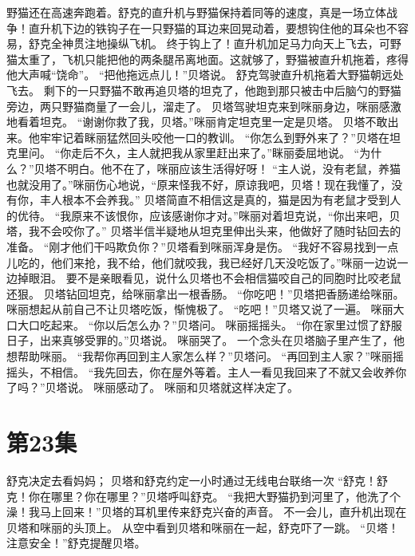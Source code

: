 \documentclass[a4paper,12pt,UTF8,twoside]{ctexbook}
\begin{document}
        野猫还在高速奔跑着。舒克的直升机与野猫保持着同等的速度，真是一场立体战争！直升机下边的铁钩子在一只野猫的耳边来回晃动着，要想钩住他的耳朵也不容易，舒克全神贯注地操纵飞机。 
        终于钩上了！直升机加足马力向天上飞去，可野猫太重了，飞机只能把他的两条腿吊离地面。这就够了，野猫被直升机拖着，疼得他大声喊“饶命”。 
        “把他拖远点儿！”贝塔说。 
        舒克驾驶直升机拖着大野猫朝远处飞去。 
        剩下的一只野猫不敢再追贝塔的坦克了，他跑到那只被击中后脑勺的野猫旁边，两只野猫商量了一会儿，溜走了。 
        贝塔驾驶坦克来到咪丽身边，咪丽感激地看着坦克。 
        “谢谢你救了我，贝塔。”咪丽肯定坦克里一定是贝塔。 
        贝塔不敢出来。他牢牢记着眯丽猛然回头咬他一口的教训。 
        “你怎么到野外来了？”贝塔在坦克里问。 
        “你走后不久，主人就把我从家里赶出来了。”眯丽委屈地说。 
        “为什么？”贝塔不明白。他不在了，咪丽应该生活得好呀！ 
        “主人说，没有老鼠，养猫也就没用了。”咪丽伤心地说，“原来怪我不好，原谅我吧，贝塔！现在我懂了，没有你，丰人根本不会养我。” 
        贝塔简直不相信这是真的，猫是因为有老鼠才受到人的优待。 
        “我原来不该恨你，应该感谢你才对。”咪丽对着坦克说，“你出来吧，贝塔，我不会咬你了。” 
        贝塔半信半疑地从坦克里伸出头来，他做好了随时钻回去的准备。 
        “刚才他们干吗欺负你？”贝塔看到咪丽浑身是伤。 
        “我好不容易找到一点儿吃的，他们来抢，我不给，他们就咬我，我已经好几天没吃饭了。”咪丽一边说一边掉眼泪。 
        要不是亲眼看见，说什么贝塔也不会相信猫咬自己的同胞时比咬老鼠还狠。 
        贝塔钻回坦克，给咪丽拿出一根香肠。 
        “你吃吧！”贝塔把香肠递给咪丽。 
        咪丽想起从前自己不让贝塔吃饭，惭愧极了。 
        “吃吧！”贝塔又说了一遍。 
        咪丽大口大口吃起来。 
        “你以后怎么办？”贝塔问。 
        咪丽摇摇头。 
        “你在家里过惯了舒服日子，出来真够受罪的。”贝塔说。 
        咪丽哭了。 
        一个念头在贝塔脑子里产生了，他想帮助咪丽。 
        “我帮你再回到主人家怎么样？”贝塔问。 
        “再回到主人家？”咪丽摇摇头，不相信。 
        “我先回去，你在屋外等着。主人一看见我回来了不就又会收养你了吗？”贝塔说。 
        咪丽感动了。 
        咪丽和贝塔就这样决定了。   \chapter{第23集} 
        舒克决定去看妈妈； 
        贝塔和舒克约定一小时通过无线电台联络一次   
        “舒克！舒克！你在哪里？你在哪里？”贝塔呼叫舒克。 
        “我把大野猫扔到河里了，他洗了个澡！我马上回来！”贝塔的耳机里传来舒克兴奋的声音。 
        不一会儿，直升机出现在贝塔和咪丽的头顶上。 
        从空中看到贝塔和咪丽在一起，舒克吓了一跳。 
        “贝塔！注意安全！”舒克提醒贝塔。 
\end{document}
